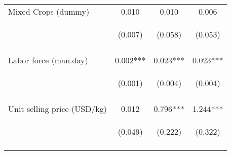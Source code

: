 \begin{center}
\begin{tabular}{lccc}
Mixed Crops (dummy) & 0.010 & 0.010 & 0.006 \\
 & \begin{footnotesize}(0.007)\end{footnotesize} & \begin{footnotesize}(0.058)\end{footnotesize} & \begin{footnotesize}(0.053)\end{footnotesize} \\
\vspace{4pt} & \begin{footnotesize}[0.156]\end{footnotesize} & \begin{footnotesize}[0.858]\end{footnotesize} & \begin{footnotesize}[0.909]\end{footnotesize} \\
Labor force (man.day) & 0.002*** & 0.023*** & 0.023*** \\
 & \begin{footnotesize}(0.001)\end{footnotesize} & \begin{footnotesize}(0.004)\end{footnotesize} & \begin{footnotesize}(0.004)\end{footnotesize} \\
\vspace{4pt} & \begin{footnotesize}[0.003]\end{footnotesize} & \begin{footnotesize}[0.000]\end{footnotesize} & \begin{footnotesize}[0.000]\end{footnotesize} \\
Unit selling price (USD/kg) & 0.012 & 0.796*** & 1.244*** \\
 & \begin{footnotesize}(0.049)\end{footnotesize} & \begin{footnotesize}(0.222)\end{footnotesize} & \begin{footnotesize}(0.322)\end{footnotesize} \\
\vspace{4pt} & \begin{footnotesize}[0.805]\end{footnotesize} & \begin{footnotesize}[0.000]\end{footnotesize} & \begin{footnotesize}[0.000]\end{footnotesize} \\

\end{tabular}
\end{center}
